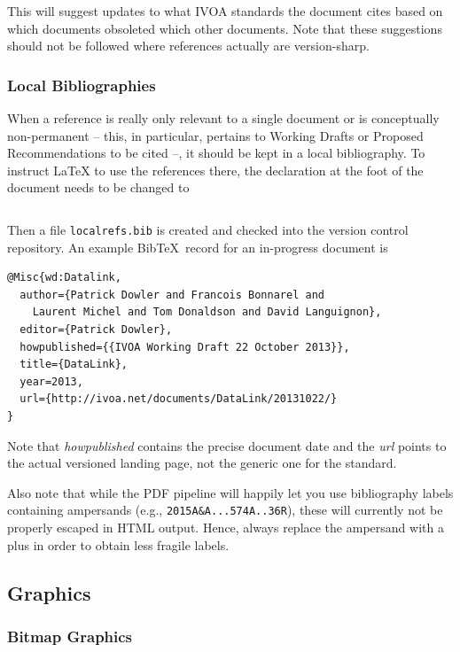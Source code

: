 \documentclass[11pt,a4paper]{ivoa}
\newcommand{\BibTeX}{Bib\TeX}
\begin{document}
This will suggest updates to what IVOA standards the document cites
based on which documents obsoleted which other documents.  Note that
these suggestions should not be followed where references actually are
version-sharp.

\subsubsection{Local Bibliographies}

When a reference is really only relevant to a single document or is
conceptually non-permanent -- this, in particular, pertains to Working
Drafts or Proposed Recommendations to be cited --, it should be kept in a
local bibliography.  To instruct \LaTeX{} to use the references there,
the declaration at the foot of the document needs to be
changed to

\begin{lstlisting}

\end{lstlisting}

Then a file \texttt{localrefs.bib} is created and checked into the
version control repository.  An example \BibTeX\ record for an
in-progress document is

\begin{lstlisting}
@Misc{wd:Datalink,
  author={Patrick Dowler and Francois Bonnarel and
    Laurent Michel and Tom Donaldson and David Languignon},
  editor={Patrick Dowler},
  howpublished={{IVOA Working Draft 22 October 2013}},
  title={DataLink},
  year=2013,
  url={http://ivoa.net/documents/DataLink/20131022/}
}
\end{lstlisting}

Note that \emph{howpublished} contains the precise document date and the
\emph{url} points to the actual versioned landing page, not the generic
one for the standard.

Also note that while the PDF pipeline will happily let you use
bibliography labels containing ampersands (e.g.,
\verb|2015A&A...574A..36R|), these will currently not be properly
escaped in HTML output.  Hence, always replace the ampersand with a plus
in order to obtain less fragile labels.

\subsection{Graphics}

\subsubsection{Bitmap Graphics}
\end{document}
